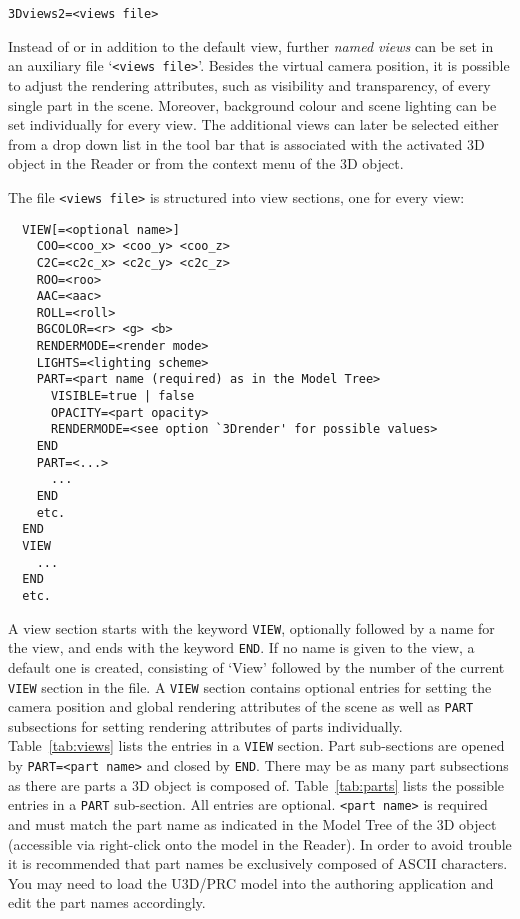 \documentclass[a4paper]{article}
\begin{document}
\begin{verbatim}
3Dviews2=<views file>
\end{verbatim}
Instead of or in addition to the default view, further \emph{named views} can be set in an auxiliary file `\verb+<views file>+'. Besides the virtual camera position, it is possible to adjust the rendering attributes, such as visibility and transparency, of every single part in the scene. Moreover, background colour and scene lighting can be set individually for every view. The additional views can later be selected either from a drop down list in the tool bar that is associated with the activated 3D object in the Reader or from the context menu of the 3D object.

The file \verb+<views file>+ is structured into view sections, one for every view:
\begin{verbatim}
  VIEW[=<optional name>]
    COO=<coo_x> <coo_y> <coo_z>
    C2C=<c2c_x> <c2c_y> <c2c_z>
    ROO=<roo>
    AAC=<aac>
    ROLL=<roll>
    BGCOLOR=<r> <g> <b>
    RENDERMODE=<render mode>
    LIGHTS=<lighting scheme>
    PART=<part name (required) as in the Model Tree>
      VISIBLE=true | false
      OPACITY=<part opacity>
      RENDERMODE=<see option `3Drender' for possible values>
    END
    PART=<...>
      ...
    END
    etc.
  END
  VIEW
    ...
  END
  etc.
\end{verbatim}
A view section starts with the keyword \verb+VIEW+, optionally followed by a name for the view, and ends with the keyword \verb+END+. If no name is given to the view, a default one is created, consisting of `View' followed by the number of the current \verb+VIEW+ section in the file. A \verb+VIEW+ section contains optional entries for setting the camera position and global rendering attributes of the scene as well as \verb+PART+ subsections for setting rendering attributes of parts individually. Table~\ref{tab:views} lists the entries in a \verb+VIEW+ section. Part sub-sections are opened by \verb+PART=<part name>+ and closed by \verb+END+. There may be as many part subsections as there are parts a 3D object is composed of. Table~\ref{tab:parts} lists the possible entries in a \verb+PART+ sub-section. All entries are optional. \verb+<part name>+ is required and must match the part name as indicated in the Model Tree of the 3D object (accessible via right-click onto the model in the Reader). In order to avoid trouble it is recommended that part names be exclusively composed of ASCII characters. You may need to load the U3D/PRC model into the authoring application and edit the part names accordingly.
\end{document}
